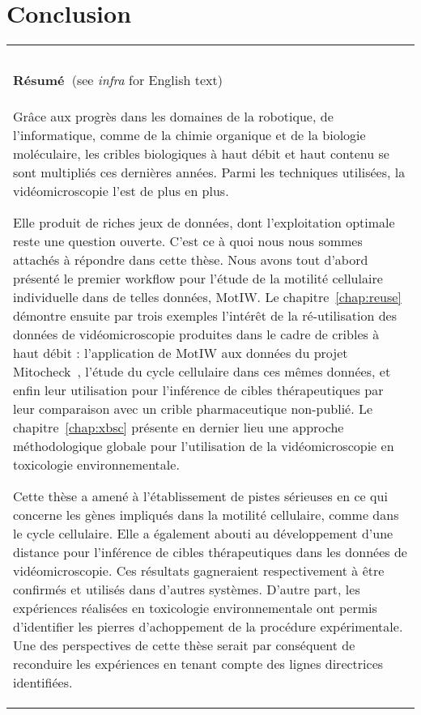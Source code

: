\chapter{Conclusion}
\begin{table}[!ht]
\begin{tabular}{|l|}
\hline
~\\

\textbf{Résumé~}(see \textit{infra} for English text)\\
\parbox{15cm}{Grâce aux progrès dans les domaines de la robotique, de l'informatique, comme de la chimie organique et de la biologie moléculaire, les cribles biologiques à haut débit et haut contenu se sont multipliés ces dernières années. Parmi les techniques utilisées, la vidéomicroscopie l'est de plus en plus.

Elle produit de riches jeux de données, dont l'exploitation optimale reste une question ouverte. C'est ce à quoi nous nous sommes attachés à répondre dans cette thèse. Nous avons tout d'abord présenté le premier workflow pour l'étude de la motilité cellulaire individuelle dans de telles données, MotIW. Le chapitre~\ref{chap:reuse} démontre ensuite par trois exemples l'intérêt de la ré-utilisation des données de vidéomicroscopie produites dans le cadre de cribles à haut débit : l'application de MotIW aux données du projet Mitocheck~\cite{pmid20360735}, l'étude du cycle cellulaire dans ces mêmes données, et enfin leur utilisation pour l'inférence de cibles thérapeutiques par leur comparaison avec un crible pharmaceutique non-publié. Le chapitre~\ref{chap:xbsc} présente en dernier lieu une approche méthodologique globale pour l'utilisation de la vidéomicroscopie en toxicologie environnementale.

Cette thèse a amené à l'établissement de pistes sérieuses en ce qui concerne les gènes impliqués dans la motilité cellulaire, comme dans le cycle cellulaire. Elle a également abouti au développement d'une distance pour l'inférence de cibles thérapeutiques dans les données de vidéomicroscopie. Ces résultats gagneraient respectivement à être confirmés et utilisés dans d'autres systèmes. D'autre part, les expériences réalisées en toxicologie environnementale ont permis d'identifier les pierres d'achoppement de la procédure expérimentale. Une des perspectives de cette thèse serait par conséquent de reconduire les expériences en tenant compte des lignes directrices identifiées.}\\
~\\
\hline
\end{tabular}
\end{table}
